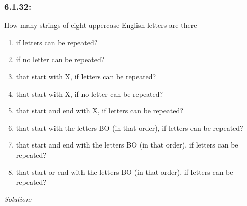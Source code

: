 \documentclass[a4paper]{article}
\begin{document}
\subsubsection*{6.1.32:}How many strings of eight uppercase English letters are there
\begin{enumerate}[label = \textbf{\alph*)}]
	\item if letters can be repeated?
	\item if no letter can be repeated?
	\item that start with X, if letters can be repeated?
	\item that start with X, if no letter can be repeated?
	\item that start and end with X, if letters can be repeated?
	\item that start with the letters BO (in that order), if letters can be repeated?
	\item that start and end with the letters BO (in that order), if letters can be repeated?
	\item that start or end with the letters BO (in that order), if letters can be repeated?
\end{enumerate}
\emph{Solution:}
\end{document}
